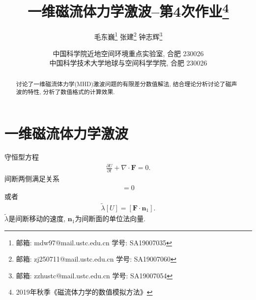 \documentclass[10.5pt
]{article}
\begin{document}
\renewcommand{\refname}{参考文献}
\renewcommand{\figurename}{图}
\renewcommand{\abstractname}{摘要}

\title{一维磁流体力学激波--第4次作业\footnote{2019年秋季《磁流体力学的数值模拟方法》}}

\author{
	毛东巍\footnote{邮箱: mdw97@mail.ustc.edu.cn  学号: SA19007035}\quad 
	张建\footnote{邮箱: zj250711@mail.ustc.edu.cn  学号: SA19007060}\quad 
	钟志辉\footnote{邮箱: zzhustc@mail.ustc.edu.cn  学号: SA19007054}
}

\date{%
\scriptsize%
中国科学院近地空间环境重点实验室, 合肥 230026\\
中国科学技术大学地球与空间科学学院, 合肥 230026
%
}

\maketitle

\begin{abstract}
讨论了一维磁流体力学(MHD)激波问题的有限差分数值解法, 结合理论分析讨论了磁声波的特性,
分析了数值格式的计算效果.
\end{abstract}

\section{一维磁流体力学激波\citep{Jeffrey1964}}
守恒型方程
\begin{align}
\frac{\partial U}{\partial t} + \nabla \cdot \boldsymbol{F} = 0. \label{Eqn:3.1.6}
\end{align}
间断两侧满足关系
\begin{align}
[\tilde{\lambda} U - \boldsymbol{F} \cdot \boldsymbol{n}_1] = 0 \label{Eqn:3.1.11}
\end{align}
或者
\begin{align}
\tilde{\lambda} [U] = [\boldsymbol{F} \cdot \boldsymbol{n}_1]. \label{Eqn:3.1.11a}
\end{align}
$\tilde{\lambda}$是间断移动的速度, $\boldsymbol{n}_1$为间断面的单位法向量.
\end{document}
